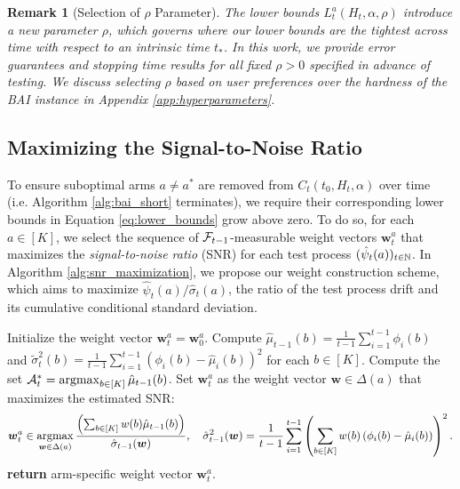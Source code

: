 \documentclass{article}
\newtheorem{remark}{Remark}
\begin{document}
\begin{remark}[Selection of $\rho$ Parameter]
    The lower bounds $L_t^a(H_t, \alpha, \rho)$ introduce a new parameter $\rho$, which governs where our lower bounds are the tightest across time with respect to an \textit{intrinsic} time $t_*$. In this work, we provide error guarantees and stopping time results for all fixed $\rho >0$ specified in advance of testing. We discuss selecting $\rho$ based on user preferences over the hardness of the BAI instance in Appendix \ref{app:hyperparameters}. 
\end{remark}


\subsection{Maximizing the Signal-to-Noise Ratio}
To ensure suboptimal arms $a \neq a^*$ are removed from $C_t(t_0, H_t, \alpha)$ over time (i.e. Algorithm \ref{alg:bai_short} terminates), we require their corresponding lower bounds in Equation \eqref{eq:lower_bounds} grow above zero. To do so, for each $ a\in[K]$, we select the sequence of $\mathcal{F}_{t-1}$-measurable weight vectors $\bm{w}_t^a$ that maximizes the \textit{signal-to-noise ratio} (SNR) for each test process $(\hat\psi_t(a))_{t \in \mathbb{N}}$. In Algorithm \ref{alg:snr_maximization}, we propose our weight construction scheme, which aims to maximize $\hat\psi_t(a)/\hat\sigma_t(a)$, the ratio of the test process drift and its cumulative conditional standard deviation. 

\begin{algorithm}[t]
\begin{algorithmic}[1]
    \State Initialize the weight vector $\bm{w}_t^a = \bm{w}_0^a$.
    \State Compute $\hat\mu_{t-1}(b) = \frac{1}{t-1}\sum_{i=1}^{t-1} \phi_i(b)$ and $\tilde\sigma_t^2(b) = \frac{1}{t-1}\sum_{i=1}^{t-1} (\phi_i(b) - \hat\mu_{i}(b))^2$ for each $b \in [K]$. 
    \State Compute the set $\Acal_t^* = \argmax_{b \in [K]} \hat\mu_{t-1}(b)$. 
        \State Set $\bm{w}_t^a$ as the weight vector $\bm{w} \in \Delta(a)$ that maximizes the estimated SNR: 
     $$\bm{w}_t^a \in \argmax_{\bm{w} \in \Delta(a)} \frac{\left(\sum_{b \in [K]} w(b) \hat\mu_{t-1}(b)\right)}{\hat\sigma_{t-1}(\bm{w})}, \quad \hat\sigma_{t-1}^2(\bm{w}) = \frac{1}{t-1} \sum_{i=1}^{t-1} \left( \sum_{b \in [K]} w(b)\left( \phi_i(b) - \hat\mu_{i}(b) \right)  \right)^2.$$\label{l:snr_maximization_problem}
    \EndIf
    \State \textbf{return} arm-specific weight vector $\bm{w}_t^a$.   
\EndProcedure
\end{algorithmic}
\caption{Signal-to-Noise Ratio (SNR) Maximization}\label{alg:snr_maximization}
\end{algorithm}
\end{document}
